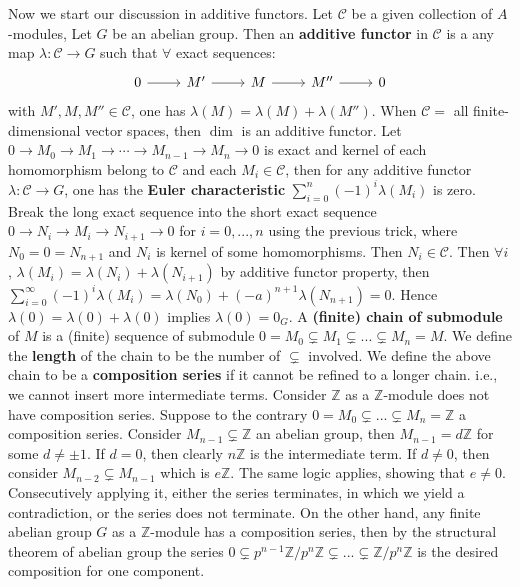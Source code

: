 \documentclass[12pt]{article}
\theoremstyle{definition}
\theoremstyle{plain}
\newcommand{\z}{\mathbb{Z}}
\begin{document}
 \medskip
Now we start our discussion in additive functors.
\Def Let $\mathcal{C}$ be a given collection of $A$-modules, Let $G$ be an abelian group. Then an \textbf{additive functor} in $\mathcal{C}$ is a any map $\lambda:\mathcal{C}\to G$ such that $\forall$ exact sequences:
\begin{equation}
  \begin{tikzcd}
    0\ar{r} &M'\ar{r} &M\ar{r} &M''\ar{r} &0
  \end{tikzcd}
\end{equation}
with $M', M, M''\in \mathcal{C}$, one has $\lambda(M)=\lambda(M)+\lambda(M'')$.
\Exe When $\mathcal{C}=$ all finite-dimensional vector spaces, then $\dim$ is an additive functor.
\Prop Let $0\to M_0\to M_1\to \cdots \to M_{n-1}\to M_n\to 0$ is exact and kernel of each homomorphism belong to $\mathcal{C}$ and each $M_i\in \mathcal{C}$, then for any additive functor $\lambda: \mathcal{C}\to G$, one has the \textbf{Euler characteristic} $\sum_{i=0}^n(-1)^i\lambda(M_i)$ is zero.
\proof Break the long exact sequence into the short exact sequence $0\to N_i\to M_i\to N_{i+1}\to 0$ for $i=0, ..., n$ using the previous trick, where $N_0=0=N_{n+1}$ and $N_i$ is kernel of some homomorphisms. Then $N_i\in \mathcal{C}$. Then $\forall i$, $\lambda(M_i)=\lambda(N_i)+\lambda(N_{i+1})$ by additive functor property, then $\sum_{i=0}^\infty (-1)^i\lambda(M_i)=\lambda(N_0)+(-a)^{n+1}\lambda(N_{n+1})=0$. Hence $\lambda(0)=\lambda(0)+\lambda(0)$  implies $\lambda(0)=0_G$.
\Def A \textbf{(finite) chain of submodule} of $M$ is a (finite) sequence of submodule $0=M_0\subsetneq M_1\subsetneq ...\subsetneq M_n=M$. We define the \textbf{length} of the chain to be the number of $\subsetneq$ involved.
\Def We define the above chain to be a \textbf{composition series} if it cannot be refined to a longer chain. i.e., we cannot insert more intermediate terms.
\Exe Consider $\z$ as a $\z$-module does not have composition series. Suppose to the contrary $0=M_0\subsetneq ...\subsetneq M_n=\z$ a composition series. Consider $M_{n-1}\subsetneq \z$ an abelian group, then $M_{n-1}=d\z$ for some $d\neq \pm1$. If $d=0$, then clearly $n\z$ is the intermediate term. If $d\neq 0$, then consider $M_{n-2}\subsetneq M_{n-1}$ which is $e\z$. The same logic applies, showing that $e\neq 0$. Consecutively applying it, either the series terminates, in which we yield a contradiction, or the series does not terminate.
\Exe On the other hand, any finite abelian group $G$ as a $\z$-module has a composition series, then by the structural theorem of abelian group the series $0\subsetneq p^{n-1}\z/p^n\z\subsetneq...\subsetneq \z/p^n\z$ is the desired composition for one component.
\end{document}

